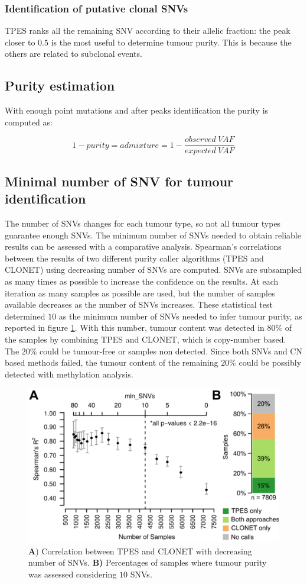         \subsubsection{Identification of putative clonal SNVs}
        TPES ranks all the remaining SNV according to their allelic fraction: the peak closer to $0.5$ is the most useful to determine tumour purity.
        This is because the others are related to subclonal events.

    \subsection{Purity estimation}
    With enough point mutations and after peaks identification the purity is computed as:

    $$1-purity = admixture = 1-\frac{observed\ VAF}{expected\ VAF}$$

    \subsection{Minimal number of SNV for tumour identification}
    The number of SNVs changes for each tumour type, so not all tumour types guarantee enough SNVs.
    The minimum number of SNVs needed to obtain reliable results can be assessed with a comparative analysis.
    Spearman's correlations between the results of two different purity caller algorithms (TPES and CLONET) using decreasing number of SNVs are computed.
    SNVs are subsampled as many times as possible to increase the confidence on the results.
    At each iteration as many samples as possible are used, but the number of samples available decreases as the number of SNVs increases.
    These statistical test determined $10$ as the minimum number of SNVs needed to infer tumour purity, as reported in figure \ref{fig:comp}.
    With this number, tumour content was detected in $80\%$ of the samples by combining TPES and CLONET, which is copy-number based.
    The $20\%$ could be tumour-free or samples non detected.
    Since both SNVs and CN based methods failed, the tumour content of the remaining $20\%$ could be possibly detected with methylation analysis.

    \begin{figure}[H]
    \centering
        \includegraphics[width=0.7\linewidth]{comparative.png}
        \caption{\textbf{A}) Correlation between TPES and CLONET with decreasing number of SNVs. \textbf{B)} Percentages of samples where tumour purity was assessed considering $10$ SNVs.}
        \label{fig:comp}
    \end{figure}

